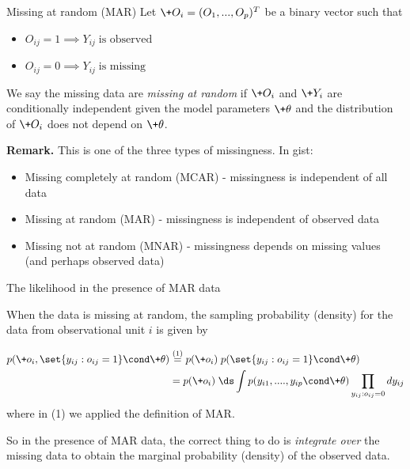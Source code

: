 \documentclass[10pt]{beamer}
\begin{document}
\begin{frame}{Missing at random (MAR)}
Let $\+O_i = (O_1, ..., O_p)^T$ be a binary vector such that
\begin{itemize}
\item $O_{ij} = 1 \implies  Y_{ij}  \; \text{is observed}$ 
\item $O_{ij} = 0 \implies  Y_{ij}  \; \text{is missing}$ 
\end{itemize}

\vfill

\begin{definition}
We say the missing data are \textit{missing at random} if $\+O_i$ and $\+Y_i$ are conditionally independent given the model parameters  $\+\theta$  and the distribution of $\+O_i$ does not depend on $\+\theta$.
\end{definition}


\vfill  \vfill \vfill  \pause 

\scriptsize
\textbf{Remark.}  This is one of the three types of missingness.   In gist:
\begin{itemize}
\item Missing completely at random (MCAR) - missingness is independent of all data
\item Missing at random (MAR) - missingness is independent of observed data
\item Missing not at random (MNAR) - missingness depends on missing values (and perhaps observed data)
\end{itemize}


\end{frame}


\begin{frame}{The likelihood in the presence of MAR data}

When the data is missing at random,  the sampling probability (density) for the data from observational unit $i$ is given by

\begin{align*}
p(\+o_i,  \set{y_{ij} : o_{ij} =1} \cond \+\theta) & \stackrel{(1)}{=} p(\+o_i) \;  p(\set{y_{ij} : o_{ij} =1} \cond \+\theta) \\
&=  p(\+o_i) \;  \ds\int p(y_{i1}, ...., y_{ip}  \cond \+\theta)  \prod_{y_{ij} : o_{ij} = 0} dy_{ij}
\end{align*}
\footnotesize where in (1) we applied the definition of MAR. \normalsize

\vfill \vfill \pause

\greencheck So in the presence of MAR data, the correct thing to do is \textit{integrate over} the missing data to obtain the marginal probability (density) of the observed data. 
\end{frame}
\end{document}
